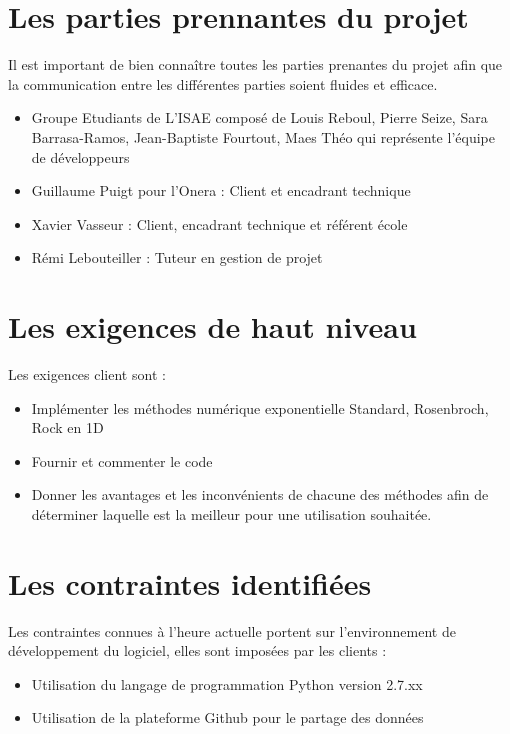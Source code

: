 \documentclass[a4paper,12pt]{report}
\theoremstyle{break}
\begin{document}
\section{Les parties prennantes du projet}	
   Il est important de bien connaître toutes les parties prenantes du projet afin que la communication entre les différentes parties soient fluides et efficace. 
   \begin{itemize}[label=\textbullet]
   	\item Groupe Etudiants de L’ISAE composé de Louis Reboul, Pierre Seize, Sara Barrasa-Ramos, Jean-Baptiste Fourtout, Maes Théo qui représente l’équipe de développeurs
   	\item Guillaume  Puigt pour l'Onera : Client et encadrant technique
   	\item Xavier Vasseur : Client, encadrant technique et référent école
   	\item Rémi Lebouteiller : Tuteur en gestion de projet
    \end{itemize}

\section{Les exigences de haut niveau}
    Les exigences client sont :
   \begin{itemize}[label=\textbullet]
   	\item Implémenter les méthodes numérique exponentielle Standard, Rosenbroch, Rock en 1D
   	\item Fournir et commenter le code
   	\item Donner les avantages et les inconvénients de chacune des méthodes afin de déterminer laquelle est la meilleur pour une utilisation souhaitée.
    \end{itemize}

\section{Les contraintes identifiées}
    Les contraintes connues à l’heure actuelle portent sur l’environnement de développement du logiciel, elles sont imposées par les clients :
   \begin{itemize}[label=\textbullet]
   	\item Utilisation du langage de programmation Python version 2.7.xx
   	\item Utilisation de la plateforme Github pour le partage des données
    \end{itemize}
\end{document}
